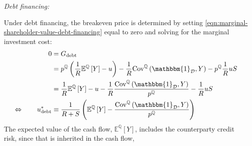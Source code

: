 \documentclass[main.tex]{subfiles}
\begin{document}
            \noindent
            \textit{Debt financing:}\par
            Under debt financing, the breakeven price is determined by setting
            \cref{eqn:marginal-shareholder-value-debt-financing} equal to zero
            and solving for the marginal investment cost:
                \begin{align}
                    0 &= G_{\text{debt}} 
                        \nonumber\\
                    &=
                        p^{\mathbb{Q}} \left(
                            \discountfactor
                            \mathbb{E}^{\mathbb{Q}}\left[Y\right]
                            - u
                        \right)
                        -
                        \discountfactor
                        \text{Cov}^{\mathbb{Q}}\left(\mathbbm{1}_{\mathcal{D}}, Y\right) 
                        - 
                        p^{\mathbb{Q}} \discountfactor u S 
                        \nonumber\\
                    &= 
                        \discountfactor
                        \mathbb{E}^{\mathbb{Q}}\left[Y\right]  
                        - u
                        - 
                        \discountfactor
                        \frac{
                            \text{Cov}^{\mathbb{Q}}\left(\mathbbm{1}_{\mathcal{D}}, Y\right) 
                        }{
                            p^{\mathbb{Q}}
                        }
                        - \discountfactor u S 
                        \nonumber\\
                    \Leftrightarrow \qquad
                    u^{\ast}_{\text{debt}}
                    &\equiv
                        \frac{
                            1
                        }{
                            \grossrfrate + S
                        } 
                        \left(
                            \mathbb{E}^{\mathbb{Q}}\left[Y\right]
                            - \frac{
                                \text{Cov}^{\mathbb{Q}}\left(\mathbbm{1}_{\mathcal{D}}, Y\right)
                            }{
                                p^{\mathbb{Q}}  
                            } 
                        \right)
                    \label{eqn:shareholders-breakeven-debt-financing}
                \end{align}
            The expected value of the cash flow, $\mathbb{E}^{\mathbb{Q}}\left[Y\right]$,
            includes the counterparty credit risk, since that is inherited in the cash flow, 
\end{document}
